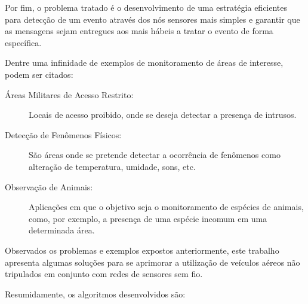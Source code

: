 Por fim, o problema tratado é o desenvolvimento de uma estratégia eficientes para detecção de um evento através dos
nós sensores mais simples e garantir que as mensagens sejam entregues aos \vants
mais hábeis a tratar o evento de forma específica.

Dentre uma infinidade de exemplos de monitoramento de áreas de interesse,
podem ser citados:

\begin{description}
 \item [Áreas Militares de Acesso Restrito:] Locais de acesso proibido, onde se deseja detectar a presença de intrusos.
 \item [Detecção de Fenômenos Físicos:] São áreas onde se pretende detectar a ocorrência de fenômenos como alteração de
temperatura, umidade, sons, etc.
 \item [Observação de Animais:] Aplicações em que o objetivo seja o monitoramento de espécies de animais, como, por exemplo,
a presença de uma espécie incomum em uma determinada área.
\end{description}



Observados os problemas e exemplos expostos anteriormente, este trabalho apresenta algumas soluções para se aprimorar
a utilização de veículos aéreos não tripulados em conjunto com redes de sensores sem fio.

Resumidamente, os algoritmos desenvolvidos são:

